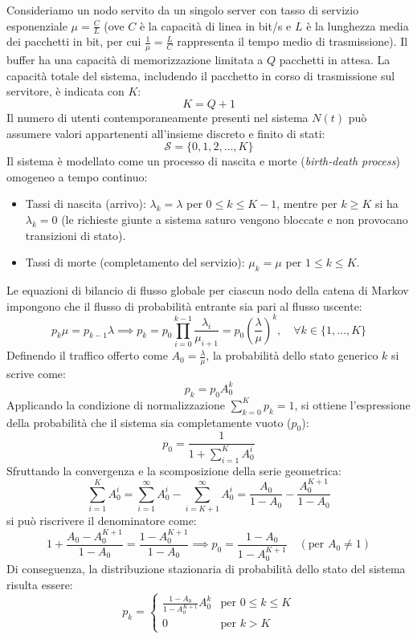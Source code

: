 \documentclass[11pt, a4paper]{article}
\begin{document}
Consideriamo un nodo servito da un singolo server con tasso di servizio esponenziale $\mu = \frac{C}{L}$ (ove $C$ è la capacità di linea in bit/s e $L$ è la lunghezza media dei pacchetti in bit, per cui $\frac{1}{\mu} = \frac{L}{C}$ rappresenta il tempo medio di trasmissione). Il buffer ha una capacità di memorizzazione limitata a $Q$ pacchetti in attesa. La capacità totale del sistema, includendo il pacchetto in corso di trasmissione sul servitore, è indicata con $K$:
\[
K = Q + 1
\]
Il numero di utenti contemporaneamente presenti nel sistema $N(t)$ può assumere valori appartenenti all'insieme discreto e finito di stati:
\[
\mathcal{S} = \{0, 1, 2, \dots, K\}
\]
Il sistema è modellato come un processo di nascita e morte (\emph{birth-death process}) omogeneo a tempo continuo:
\begin{itemize}[noitemsep]
    \item Tassi di nascita (arrivo): $\lambda_k = \lambda$ per $0 \le k \le K-1$, mentre per $k \ge K$ si ha $\lambda_k = 0$ (le richieste giunte a sistema saturo vengono bloccate e non provocano transizioni di stato).
    \item Tassi di morte (completamento del servizio): $\mu_k = \mu$ per $1 \le k \le K$.
\end{itemize}

Le equazioni di bilancio di flusso globale per ciascun nodo della catena di Markov impongono che il flusso di probabilità entrante sia pari al flusso uscente:
\[
p_k \mu = p_{k-1} \lambda \implies p_k = p_0 \prod_{i=0}^{k-1} \frac{\lambda_i}{\mu_{i+1}} = p_0 \left( \frac{\lambda}{\mu} \right)^k, \quad \forall k \in \{1, \dots, K\}
\]
Definendo il traffico offerto come $A_0 = \frac{\lambda}{\mu}$, la probabilità dello stato generico $k$ si scrive come:
\[
p_k = p_0 A_0^k
\]
Applicando la condizione di normalizzazione $\sum_{k=0}^K p_k = 1$, si ottiene l'espressione della probabilità che il sistema sia completamente vuoto ($p_0$):
\[
p_0 = \frac{1}{1 + \displaystyle\sum_{i=1}^K A_0^i}
\]
Sfruttando la convergenza e la scomposizione della serie geometrica:
\[
\sum_{i=1}^K A_0^i = \sum_{i=1}^\infty A_0^i - \sum_{i=K+1}^\infty A_0^i = \frac{A_0}{1 - A_0} - \frac{A_0^{K+1}}{1 - A_0}
\]
si può riscrivere il denominatore come:
\[
1 + \frac{A_0 - A_0^{K+1}}{1 - A_0} = \frac{1 - A_0^{K+1}}{1 - A_0} \implies p_0 = \frac{1 - A_0}{1 - A_0^{K+1}} \quad (\text{per } A_0 \neq 1)
\]
Di conseguenza, la distribuzione stazionaria di probabilità dello stato del sistema risulta essere:
\[
\boxed{p_k = \begin{cases}
\displaystyle\frac{1 - A_0}{1 - A_0^{K+1}} A_0^k & \text{per } 0 \le k \le K \\[1em]
0 & \text{per } k > K
\end{cases}}
\]
\end{document}
